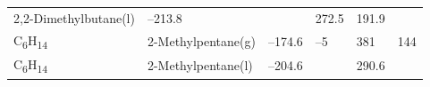 \documentclass[
  9pt,
]{extbook}
\theoremstyle{definition}
\theoremstyle{definition}
\theoremstyle{definition}
\theoremstyle{remark}
\begin{document}
\begin{longtable}[]{@{}llllll@{}}
\begin{minipage}[t]{0.17\columnwidth}
2,2-Dimethylbutane(l)\strut
\end{minipage} & \begin{minipage}[t]{0.15\columnwidth}\raggedright
--213.8\strut
\end{minipage} & \begin{minipage}[t]{0.15\columnwidth}\raggedright
\strut
\end{minipage} & \begin{minipage}[t]{0.14\columnwidth}\raggedright
272.5\strut
\end{minipage} & \begin{minipage}[t]{0.14\columnwidth}\raggedright
191.9\strut
\end{minipage}\tabularnewline
\begin{minipage}[t]{0.07\columnwidth}\raggedright
C\textsubscript{6}H\textsubscript{14}\strut
\end{minipage} & \begin{minipage}[t]{0.17\columnwidth}\raggedright
2-Methylpentane(g)\strut
\end{minipage} & \begin{minipage}[t]{0.15\columnwidth}\raggedright
--174.6\strut
\end{minipage} & \begin{minipage}[t]{0.15\columnwidth}\raggedright
--5\strut
\end{minipage} & \begin{minipage}[t]{0.14\columnwidth}\raggedright
381\strut
\end{minipage} & \begin{minipage}[t]{0.14\columnwidth}\raggedright
144\strut
\end{minipage}\tabularnewline
\begin{minipage}[t]{0.07\columnwidth}\raggedright
C\textsubscript{6}H\textsubscript{14}\strut
\end{minipage} & \begin{minipage}[t]{0.17\columnwidth}\raggedright
2-Methylpentane(l)\strut
\end{minipage} & \begin{minipage}[t]{0.15\columnwidth}\raggedright
--204.6\strut
\end{minipage} & \begin{minipage}[t]{0.15\columnwidth}\raggedright
\strut
\end{minipage} & \begin{minipage}[t]{0.14\columnwidth}\raggedright
290.6\strut
\end{minipage} & \begin{minipage}[t]{0.14\columnwidth}\raggedright

\end{minipage}
\end{longtable}
\end{document}
